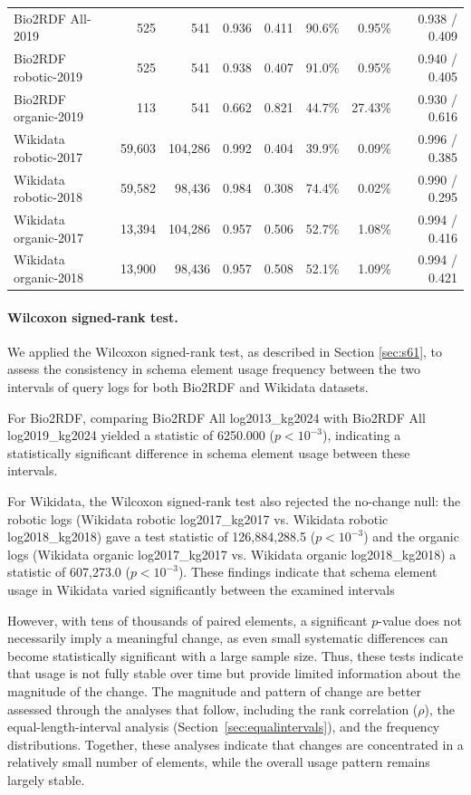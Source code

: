 \documentclass[sw]{iosart2x}
\providecommand{\DIFaddendFL}{} %
\DeclareRobustCommand{\DIFaddendFL}{\DIFOaddendFL \let\includegraphics\DIFOincludegraphics} %
\begin{document}
\begin{table}[ht]
\begin{tabular}{l|r|r|r|r|r|r|r}
Bio2RDF All-2019 & 525 & 541 & 0.936 & 0.411 & 90.6\% & 0.95\% & 0.938 / 0.409 \\
Bio2RDF robotic-2019 & 525 & 541 & 0.938 & 0.407 & 91.0\% & 0.95\% & 0.940 / 0.405 \\
Bio2RDF organic-2019 & 113 & 541 & 0.662 & 0.821 & 44.7\% & 27.43\% & 0.930 / 0.616 \\
Wikidata robotic-2017 & 59{,}603 & 104{,}286 & 0.992 & 0.404 & 39.9\% & 0.09\% & 0.996 / 0.385 \\
Wikidata robotic-2018 & 59{,}582 & 98{,}436 & 0.984 & 0.308 & 74.4\% & 0.02\% & 0.990 / 0.295 \\
Wikidata organic-2017 & 13{,}394 & 104{,}286 & 0.957 & 0.506 & 52.7\% & 1.08\% & 0.994 / 0.416 \\
Wikidata organic-2018 & 13{,}900 & 98{,}436 & 0.957 & 0.508 & 52.1\% & 1.09\% & 0.994 / 0.421 \\
\hline
\end{tabular}
\DIFaddendFL \end{table}

\paragraph{\textbf{Wilcoxon signed-rank test.}}We applied the Wilcoxon signed-rank test, as described in Section \ref{sec:s61}, to assess the consistency in schema element usage frequency between the two intervals of query logs for both Bio2RDF and Wikidata datasets.

For Bio2RDF, comparing Bio2RDF All log2013\_kg2024 with Bio2RDF All log2019\_kg2024 yielded a statistic of 6250.000 ($p < 10^{-3}$), indicating a statistically significant difference in schema element usage between these intervals.

For Wikidata, the Wilcoxon signed‐rank test also rejected the no-change null: the robotic logs (Wikidata robotic log2017\_kg2017 vs. Wikidata robotic log2018\_kg2018) gave a test statistic of 126{,}884{,}288.5 ($p < 10^{-3}$) and the organic logs (Wikidata organic log2017\_kg2017 vs. Wikidata organic log2018\_kg2018) a statistic of 607{,}273.0 ($p < 10^{-3}$). These findings indicate that schema element usage in Wikidata varied significantly between the examined
intervals

However, with tens of thousands of paired elements, a significant $p$-value does not necessarily imply a meaningful change, as even small systematic differences can become statistically significant with a large sample size. Thus, these tests indicate that usage is not fully stable over time but provide limited information about the magnitude of the change. The magnitude and pattern of change are better assessed through the analyses that follow, including the rank correlation ($\rho$), the equal-length-interval analysis (Section~\ref{sec:equalintervals}), and the frequency distributions. Together, these analyses indicate that changes are concentrated in a relatively small number of elements, while the overall usage pattern remains largely stable.
\end{document}
